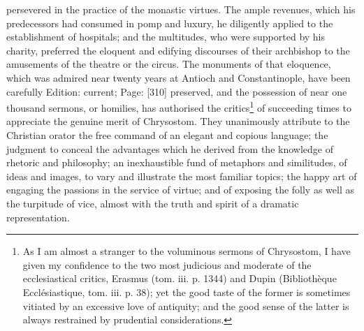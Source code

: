 persevered in the practice of the monastic virtues. The ample revenues, which his predecessors had consumed in pomp and luxury, he diligently applied to the establishment of hospitals; and the multitudes, who were supported by his charity, preferred the eloquent and edifying discourses of their archbishop to the amusements of the theatre or the circus. The monuments of that eloquence, which was admired near twenty years at Antioch and Constantinople, have been carefully Edition: current; Page: [310] preserved, and the possession of near one thousand sermons, or homilies, has authorised the critics\footnote{As I am almost a stranger to the voluminous sermons of Chrysostom, I have given my confidence to the two most judicious and moderate of the ecclesiastical critics, Erasmus (tom. iii. p. 1344) and Dupin (Bibliothèque Ecclésiastique, tom. iii. p. 38); yet the good taste of the former is sometimes vitiated by an excessive love of antiquity; and the good sense of the latter is always restrained by prudential considerations.} of succeeding times to appreciate the genuine merit of Chrysostom. They unanimously attribute to the Christian orator the free command of an elegant and copious language; the judgment to conceal the advantages which he derived from the knowledge of rhetoric and philosophy; an inexhaustible fund of metaphors and similitudes, of ideas and images, to vary and illustrate the most familiar topics; the happy art of engaging the passions in the service of virtue; and of exposing the folly as well as the turpitude of vice, almost with the truth and spirit of a dramatic representation.

